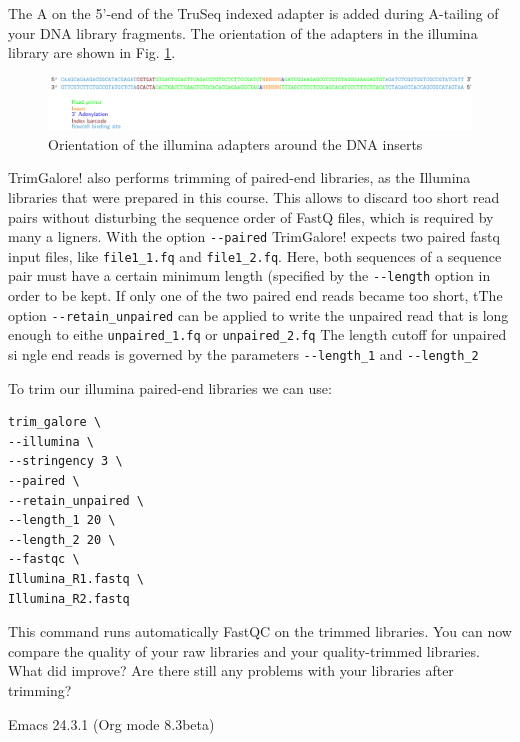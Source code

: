 \documentclass[11pt]{article}
\begin{document}
The A on the 5'-end of the TruSeq indexed adapter is added during
A-tailing of your DNA library fragments.
The orientation of the adapters in the illumina library are shown in Fig. \ref{fig:illuminaadapters}.
\begin{figure}[htb]
\centering
\includegraphics[width=17cm]{IlluminaAdaptersVisualized.pdf}
\caption{\label{fig:illuminaadapters}Orientation of the illumina adapters around the DNA inserts}
\end{figure}


TrimGalore! also performs trimming of paired-end libraries, as the
Illumina libraries that were prepared in this course. This allows to
discard too short read pairs without disturbing the sequence order of
FastQ files, which is required by many a ligners.  With the option
\texttt{-{}-paired} TrimGalore! expects two paired fastq input files, like
\texttt{file1\_1.fq} and \texttt{file1\_2.fq}.  Here, both sequences of a sequence
pair must have a certain minimum length (specified by the \texttt{-{}-length}
option in order to be kept. If only one of the two paired end reads
became too short, tThe option \texttt{-{}-retain\_unpaired} can be applied to
write the unpaired read that is long enough to eithe \texttt{unpaired\_1.fq}
or \texttt{unpaired\_2.fq} The length cutoff for unpaired si ngle end reads is
governed by the parameters \texttt{-{}-length\_1} and \texttt{-{}-length\_2}

To trim our illumina paired-end libraries we can use:

\begin{verbatim}
trim_galore \
--illumina \
--stringency 3 \
--paired \
--retain_unpaired \
--length_1 20 \
--length_2 20 \
--fastqc \
Illumina_R1.fastq \
Illumina_R2.fastq
\end{verbatim}

This command runs automatically FastQC on the trimmed libraries. You
can now compare the quality of your raw libraries and your
quality-trimmed libraries. What did improve? Are there still any
problems with your libraries after trimming?


\clearpage
Emacs 24.3.1 (Org mode 8.3beta)
\end{document}
